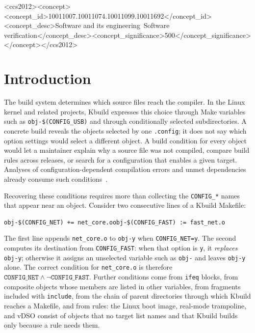 \documentclass[acmsmall,screen,review]{acmart}
\begin{document}
\begin{CCSXML}
<ccs2012><concept><concept_id>10011007.10011074.10011099.10011692</concept_id><concept_desc>Software and its engineering~Software verification</concept_desc><concept_significance>500</concept_significance></concept></ccs2012>
\end{CCSXML}
\maketitle
\pagestyle{plain}

\section{Introduction}
\label{sec:intro}

The build system determines which source files reach the compiler. In the Linux kernel and related projects, Kbuild expresses this choice through Make variables such as \texttt{obj-\$(CONFIG\_USB)} and through conditionally selected subdirectories. A concrete build reveals the objects selected by one \texttt{.config}; it does not say which option settings would select a different object. A build condition for every object would let a maintainer explain why a source file was not compiled, compare build rules across releases, or search for a configuration that enables a given target. Analyses of configuration-dependent compilation errors and unmet dependencies already consume such conditions~\cite{gazzillo2018localizing,oh2021kclause}.

Recovering these conditions requires more than collecting the \texttt{CONFIG\_*} names that appear near an object. Consider two consecutive lines of a Kbuild Makefile:
\begin{center}
\texttt{obj-\$(CONFIG\_NET) += net\_core.o}\qquad\texttt{obj-\$(CONFIG\_FAST) := fast\_net.o}
\end{center}
The first line appends \texttt{net\_core.o} to \texttt{obj-y} when \texttt{CONFIG\_NET=y}. The second computes its destination from \texttt{CONFIG\_FAST}: when that option is \texttt{y}, it \emph{replaces} \texttt{obj-y}; otherwise it assigns an unselected variable such as \texttt{obj-} and leaves \texttt{obj-y} alone. The correct condition for \texttt{net\_core.o} is therefore $\texttt{CONFIG\_NET}\land\neg\texttt{CONFIG\_FAST}$. Further conditions come from \texttt{ifeq} blocks, from composite objects whose members are listed in other variables, from fragments included with \texttt{include}, from the chain of parent directories through which Kbuild reaches a Makefile, and from rules: the Linux boot image, real-mode trampoline, and vDSO consist of objects that no target list names and that Kbuild builds only because a rule needs them.
\end{document}
